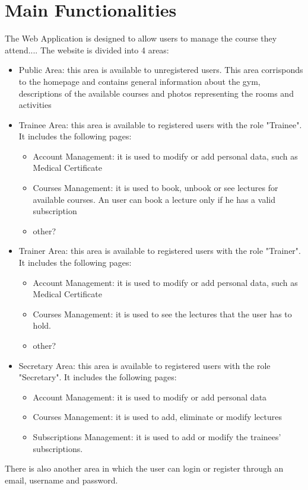 \section{Main Functionalities}

The Web Application is designed to allow users to manage the course they attend....
The website is divided into 4 areas:

\begin{itemize}
	\item Public Area: this area is available to unregistered users. This area corrisponds to the homepage and contains general information about the gym, descriptions of the available courses and photos representing the rooms and activities
	\item Trainee Area: this area is available to registered users with the role "Trainee". It includes the following pages:
	\begin{itemize}
		\item Account Management: it is used to modify or add personal data, such as Medical Certificate
		\item Courses Management: it is used to book, unbook or see lectures for available courses. An user can book a lecture only if he has a valid subscription
		\item other?
	\end{itemize}
	\item Trainer Area: this area is available to registered users with the role "Trainer". It includes the following pages:
	\begin{itemize}
		\item Account Management: it is used to modify or add personal data, such as Medical Certificate
		\item Courses Management: it is used to see the lectures that the user has to hold.
		\item other?
	\end{itemize}
	\item Secretary Area: this area is available to registered users with the role "Secretary".
	It includes the following pages:
	\begin{itemize}
		\item Account Management: it is used to modify or add personal data
		\item Courses Management: it is used to add, eliminate or modify lectures
		\item Subscriptions Management: it is used to add or modify the trainees' subscriptions.
	\end{itemize}
\end{itemize}
There is also another area in which the user can login or register through an email, username and password.\newline
